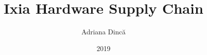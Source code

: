 \title{Ixia Hardware Supply Chain}
\author{Adriana Dincă}
\date{2019}



\newcommand{\project}{Hardware Supply on Blockchain}


